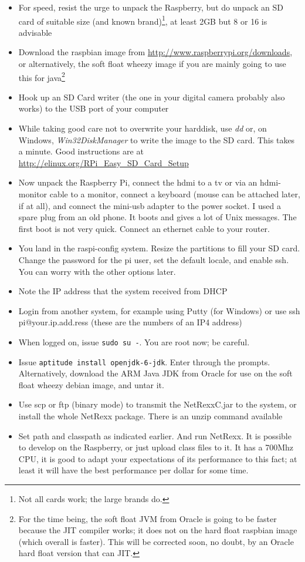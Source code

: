 \begin{itemize}
\item For speed, resist the urge to unpack the Raspberry, but do unpack an SD card of suitable size (and known brand)\footnote{Not all cards work; the large brands do.}, at least 2GB but 8 or 16 is advisable
\item Download the raspbian image from \url{http://www.raspberrypi.org/downloads}, or alternatively, the soft float wheezy image if you are mainly going to use this for java\footnote{For the time being, the soft float JVM from Oracle is going to be faster because the JIT compiler works; it does not on the hard float raspbian image (which overall is faster). This will be corrected soon, no doubt, by an Oracle hard float version that can JIT.}
\item Hook up an SD Card writer (the one in your digital camera probably also works) to the USB port of your computer
\item While taking good care not to overwrite your harddisk, use \emph{dd} or, on Windows, \emph{Win32DiskManager} to write the image to the SD card. This takes a minute. Good instructions are at \url{http://elinux.org/RPi_Easy_SD_Card_Setup}
\item Now unpack the Raspberry Pi, connect the hdmi to a tv or via an hdmi-monitor cable to a monitor, connect a keyboard (mouse can be attached later, if at all), and connect the mini-usb adapter to the power socket. I used a spare plug from an old phone. It boots and gives a lot of Unix messages. The first boot is not very quick. Connect an ethernet cable to your router.
\item You land in the raspi-config system. Resize the partitions to fill your SD card. Change the password for the pi user, set the default locale, and enable ssh. You can worry with the other options later.
\item Note the IP address that the system received from DHCP
\item Login from another system, for example using Putty (for Windows) or use ssh pi@your.ip.add.ress (these are the numbers of an IP4 address)
\item When logged on, issue \texttt{sudo su -}. You are root now; be careful.
\item Issue \texttt{aptitude install openjdk-6-jdk}. Enter through the prompts. Alternatively, download the ARM Java JDK from Oracle for use on the soft float wheezy debian image, and untar it.
\item Use scp or ftp (binary mode) to transmit the NetRexxC.jar to the system, or install the whole NetRexx package. There is an unzip command available
\item Set path and classpath as indicated earlier. And run NetRexx. It is possible to develop on the Raspberry, or just upload class files to it. It has a 700Mhz CPU, it is good to adapt your expectations of its performance to this fact; at least it will have the best performance per dollar for some time.
\end{itemize}